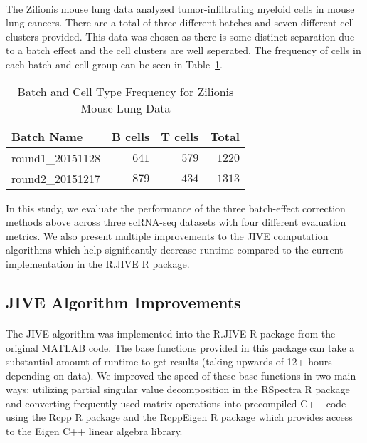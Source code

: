 \documentclass[
12pt, %
letterpaper, %
oneside, %
headinclude,footinclude, %
BCOR5mm, %
]{scrartcl}
\begin{document}
\paragraph*{}
The Zilionis mouse lung data \citep{zilionis2019single} analyzed tumor-infiltrating myeloid cells in mouse lung cancers. There are a total of three different batches and seven different cell clusters provided. This data was chosen as there is some distinct separation due to a batch effect and the cell clusters are well seperated. The frequency of cells in each batch and cell group can be seen in Table~\ref{tab:freq_zilionis}.

\begin{table}[ht]
    \caption{Batch and Cell Type Frequency for Zilionis Mouse Lung Data}
    \centering
    \begin{tabular}{lrrr}
        \toprule
        Batch Name & B cells & T cells & Total \\
        \midrule
        round1\_20151128 & $641$ & $579$ & $1220$ \\
        round2\_20151217 & $879$ & $434$ & $1313$ \\
        \bottomrule
        \end{tabular}
    \label{tab:freq_zilionis}
\end{table}

In this study, we evaluate the performance of the three batch-effect correction methods above across three scRNA-seq datasets with four different evaluation metrics. We also present multiple improvements to the JIVE computation algorithms which help significantly decrease runtime compared to the current implementation in the R.JIVE R package.

\subsection{JIVE Algorithm Improvements} \label{jive_improvements}

\paragraph*{}
The JIVE algorithm was implemented into the R.JIVE R package \citep{o2016r} from the original MATLAB code. The base functions provided in this package can take a substantial amount of runtime to get results (taking upwards of 12+ hours depending on data). We improved the speed of these base functions in two main ways: utilizing partial singular value decomposition in the RSpectra R package \citep{qiu2019rspectra} and converting frequently used matrix operations into precompiled C++ code using the Rcpp R package \citep{edelbuettel2011rcpp} and the RcppEigen R package \citep{bates2013fast} which provides access to the Eigen C++ linear algebra library.
\end{document}
